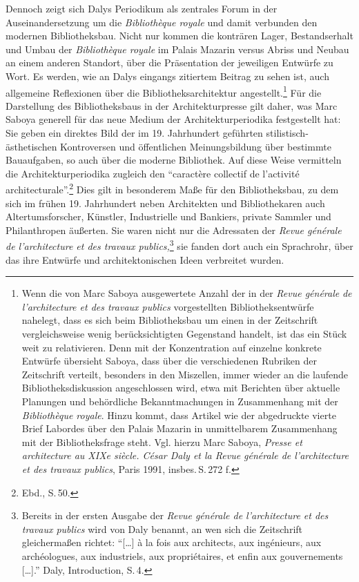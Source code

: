 Dennoch zeigt sich Dalys Periodikum als zentrales Forum in der
Auseinandersetzung um die \emph{Bibliothèque royale} und damit verbunden
den modernen Bibliotheksbau. Nicht nur kommen die konträren Lager,
Bestandserhalt und Umbau der \emph{Bibliothèque royale} im Palais
Mazarin versus Abriss und Neubau an einem anderen Standort, über die
Präsentation der jeweiligen Entwürfe zu Wort. Es werden, wie an Dalys
eingangs zitiertem Beitrag zu sehen ist, auch allgemeine Reflexionen
über die Bib\-lio\-theks\-architektur angestellt.\footnote{Wenn die von Marc
  Saboya ausgewertete Anzahl der in der \emph{Revue générale} \emph{de
  l'architecture et des travaux publics} vorgestellten
  Bibliotheksentwürfe nahelegt, dass es sich beim Bibliotheksbau um
  einen in der Zeitschrift vergleichsweise wenig berücksichtigten
  Gegenstand handelt, ist das ein Stück weit zu relativieren. Denn mit
  der Konzentration auf einzelne konkrete Entwürfe übersieht Saboya,
  dass über die verschiedenen Rubriken der Zeitschrift verteilt,
  besonders in den Miszellen, immer wieder an die laufende
  Bibliotheksdiskussion angeschlossen wird, etwa mit Berichten über
  aktuelle Planungen und behördliche Bekanntmachungen in Zusammenhang
  mit der \emph{Bibliothèque royale}. Hinzu kommt, dass Artikel wie der
  abgedruckte vierte Brief Labordes über den Palais Mazarin in
  unmittelbarem Zusammenhang mit der Bibliotheksfrage steht. Vgl. hierzu
  Marc Saboya, \emph{Presse et architecture au XIXe siècle. César Daly
  et la Revue générale de l'architecture et des travaux publics}, Paris
  1991, insbes.\,S.\,272 f.} Für die Darstellung des Bibliotheksbaus in
der Architekturpresse gilt daher, was Marc Saboya generell für das neue
Medium der Architekturperiodika festgestellt hat: Sie geben ein
direktes Bild der im 19. Jahrhundert geführten stilistisch-ästhetischen
Kontroversen und öffentlichen Meinungsbildung über bestimmte
Bauaufgaben, so auch über die moderne Bibliothek. Auf diese Weise
vermitteln die Architekturperiodika zugleich den \enquote{caractère
collectif de l'activité architecturale}.\footnote{Ebd., S.\,50.} Dies
gilt in besonderem Maße für den Bibliotheksbau, zu dem sich im frühen
19. Jahrhundert neben Architekten und Bibliothekaren auch
Altertumsforscher, Künstler, Industrielle und Bankiers, private Sammler
und Philanthropen äußerten. Sie waren nicht nur die Adressaten der
\emph{Revue générale de l'architecture et des travaux
publics,}\footnote{Bereits in der ersten Ausgabe der \emph{Revue
  générale de l'architecture et des travaux publics} wird von Daly
  benannt, an wen sich die Zeitschrift gleichermaßen richtet:
  \enquote{{[}\ldots{}{]} à la fois aux architects, aux ingénieurs, aux
  archéologues, aux industriels, aux propriétaires, et enfin aux
  gouvernements {[}\ldots{}{]}.} Daly, Introduction, S.\,4.} sie fanden
dort auch ein Sprachrohr, über das ihre Entwürfe und architektonischen
Ideen verbreitet wurden.

